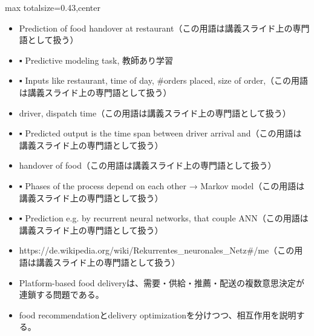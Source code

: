 \clearpage
{}
\begin{minipage}[t]{0.405\textwidth}
\begin{adjustbox}{max totalsize={\textwidth}{0.43\textheight},center}
\begin{minipage}{\textwidth}\scriptsize
{}\begin{itemize}
\item Prediction of food handover at restaurant（この用語は講義スライド上の専門語として扱う）
\item ▪ Predictive modeling task, 教師あり学習
\item ▪ Inputs like restaurant, time of day, \#orders placed, size of order,（この用語は講義スライド上の専門語として扱う）
\item driver, dispatch time（この用語は講義スライド上の専門語として扱う）
\item ▪ Predicted output is the time span between driver arrival and（この用語は講義スライド上の専門語として扱う）
\item handover of food（この用語は講義スライド上の専門語として扱う）
\item ▪ Phases of the process depend on each other → Markov model（この用語は講義スライド上の専門語として扱う）
\item ▪ Prediction e.g. by recurrent neural networks, that couple ANN（この用語は講義スライド上の専門語として扱う）
\item https://de.wikipedia.org/wiki/Rekurrentes\_neuronales\_Netz\#/me（この用語は講義スライド上の専門語として扱う）
\end{itemize}\begin{itemize}
\item Platform-based food deliveryは、需要・供給・推薦・配送の複数意思決定が連鎖する問題である。
\item food recommendationとdelivery optimizationを分けつつ、相互作用を説明する。
\end{itemize}
\end{minipage}
\end{adjustbox}
\end{minipage}\hfill
